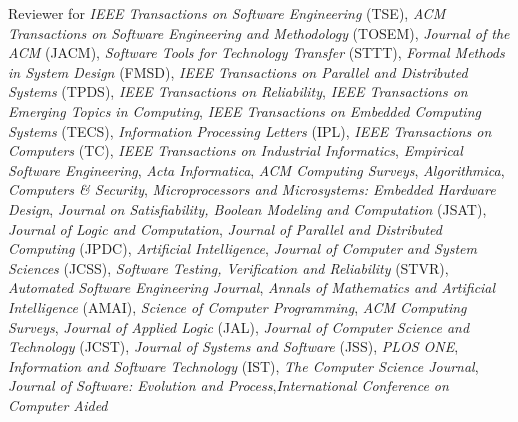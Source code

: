 \documentclass[ComputerScience]{vita}
\begin{document}
\begin{vita}
\begin{Professional Activities and Service}
  \item Reviewer for \emph{IEEE Transactions on Software Engineering} (TSE), \emph{ACM
   Transactions
   on  Software  Engineering  and  Methodology} (TOSEM), \emph{Journal of the ACM} (JACM), 
  \emph{Software Tools for Technology Transfer} (STTT), \emph{Formal
    Methods in System Design} (FMSD), \emph{IEEE Transactions on
    Parallel and Distributed Systems} (TPDS), \emph{IEEE Transactions
    on Reliability}, \emph{IEEE Transactions on Emerging Topics in Computing}, \emph{IEEE Transactions on Embedded Computing
    Systems} (TECS), \emph{Information Processing Letters} (IPL),
  \emph{IEEE Transactions on Computers} (TC), \emph{IEEE Transactions
    on Industrial Informatics}, \emph{Empirical Software Engineering},
  \emph{Acta Informatica}, \emph{ACM Computing Surveys},
  \emph{Algorithmica}, \emph{Computers \& Security},
  \emph{Microprocessors and Microsystems: Embedded Hardware Design},
  \emph{Journal on Satisfiability, Boolean Modeling and Computation}
  (JSAT), \emph{Journal of Logic and Computation}, \emph{Journal of
    Parallel and Distributed Computing} (JPDC), \emph{Artificial
    Intelligence}, \emph{Journal of Computer and System Sciences}
  (JCSS), \emph{Software Testing, Verification and Reliability}
  (STVR), \emph{Automated Software Engineering Journal}, \emph{Annals
    of Mathematics and Artificial Intelligence} (AMAI), \emph{Science
    of Computer Programming}, \emph{ACM Computing Surveys}, \emph{Journal of Applied Logic} (JAL),
  \emph{Journal of Computer Science and Technology} (JCST),
  \emph{Journal of Systems and Software} (JSS), \emph{PLOS ONE},
  \emph{Information and Software Technology} (IST), \emph{The Computer
    Science Journal}, \emph{Journal of Software: Evolution and Process},\emph{International Conference on Computer Aided
}
\end{Professional Activities and Service}
\end{vita}
\end{document}
